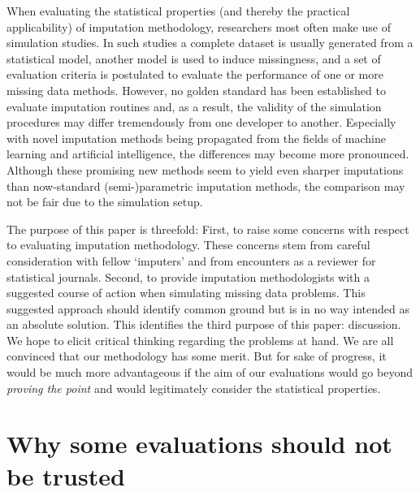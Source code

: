 \documentclass[bimj,fleqn]{w-art}
\begin{document}
When evaluating the statistical properties (and thereby the practical applicability) of imputation methodology, researchers most often make use of simulation studies. In such studies a complete dataset is usually generated from a statistical model, another model is used to induce missingness, and a set of evaluation criteria is postulated to evaluate the performance of one or more missing data methods. However, no golden standard has been established to evaluate imputation routines and, as a result, the validity of the simulation procedures may differ tremendously from one developer to another. Especially with novel imputation methods being propagated from the fields of machine learning and artificial intelligence, the differences may become more pronounced. Although these promising new methods seem to yield even sharper imputations than now-standard (semi-)parametric imputation methods, the comparison may not be fair due to the simulation setup. 


The purpose of this paper is threefold: First, to raise some concerns with respect to evaluating imputation methodology. These concerns stem from careful consideration with fellow `imputers' and from encounters as a reviewer for statistical journals. Second, to provide imputation methodologists with a suggested course of action when simulating missing data problems. This suggested approach should identify common ground but is in no way intended as an absolute solution. This identifies the third purpose of this paper: discussion. We hope to elicit critical thinking regarding the problems at hand. We are all convinced that our methodology has some merit. But for sake of progress, it would be much more advantageous if the aim of our evaluations would go beyond \textit{proving the point} and would legitimately consider the statistical properties. 



\section{Why some evaluations should not be trusted}
\end{document}
